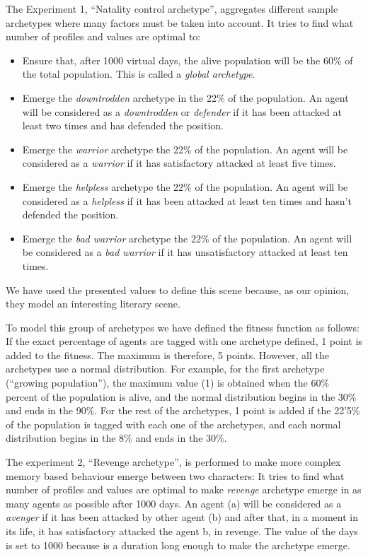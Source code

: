 \documentclass[runningheads]{llncs}
\begin{document}
The Experiment 1, ``Natality control archetype'', aggregates different sample archetypes where many factors must be taken into account.  It tries to find what number of profiles and values are optimal to:
\begin{itemize}
\item Ensure that, after 1000 virtual days, the alive population will be the 60\% of the total population. This is called a \textit{global archetype}.
\item Emerge the \textit{downtrodden} archetype in the 22\% of the
  population. An agent will be considered as a \textit{downtrodden} or
  \textit{defender} if it has been attacked at least two times and has
  defended the position. 

\item Emerge the \textit{warrior} archetype the 22\% of the population. An agent will be considered as a \textit{warrior} if it has satisfactory attacked at least five times. 
\item Emerge the \textit{helpless} archetype the 22\% of the population. An agent will be considered as a \textit{helpless}  if it has been attacked at least ten times and hasn't defended the position.
\item Emerge the \textit{bad warrior} archetype the 22\% of the population. An agent will be considered as a \textit{bad warrior}  if it has unsatisfactory attacked at least ten times.
\end{itemize}
We have used the presented values to define this scene because, as our opinion, they model an interesting literary scene.

To model this group of archetypes we have defined the fitness function as follows:
If the exact percentage of agents are tagged with one archetype defined, 1 point is added to the fitness. The maximum is therefore, 5 points. However, all the archetypes use a normal distribution. For example, for the first archetype (``growing population''), the maximum value (1) is obtained when the 60\% percent of the population is alive, and the normal distribution begins in the 30\% and ends in the 90\%. For the rest of the archetypes, 1 point is added if the 22'5\% of the population is tagged with each one of the archetypes, and each normal distribution begins in the 8\% and ends in the 30\%.


The experiment 2, ``Revenge archetype'', is performed to make more complex memory based behaviour emerge between two characters:  It tries to find what number of profiles and values are optimal to make \textit{revenge} archetype emerge in as many agents as possible after 1000 days.  An agent (a) will be considered as a \textit{avenger} if it has been attacked by other agent (b) and after that, in a moment in its life, it has satisfactory attacked the agent b, in revenge. The value of the days is set to 1000 because is a duration long enough to make the archetype emerge.
\end{document}
